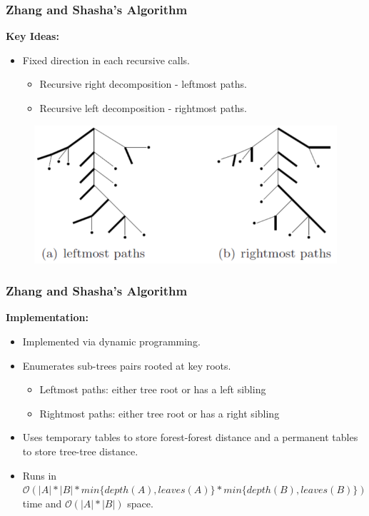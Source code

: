 \documentclass{beamer}
\begin{document}
\begin{frame}
\frametitle{Zhang and Shasha's Algorithm}
\textbf{Key Ideas:}
\begin{itemize}
\item Fixed direction in each recursive calls.
\begin{itemize}
\item Recursive right decomposition - leftmost paths.
\item Recursive left decomposition - rightmost paths.
\end{itemize}
\end{itemize}
\begin{figure}
	\includegraphics[width=0.7\linewidth]{LeftmostPathandRightmostPath}
	\centering
\end{figure}
\end{frame}
\begin{frame}
\frametitle{Zhang and Shasha's Algorithm}
\textbf{Implementation:}
\begin{itemize}
\item Implemented via dynamic programming.
\item Enumerates sub-trees pairs rooted at key roots.
\begin{itemize}
\item Leftmost paths: either tree root or has a left sibling
\item Rightmost paths: either tree root or has a right sibling
\end{itemize}
\item Uses temporary tables to store forest-forest distance and a permanent tables to store tree-tree distance.
\item Runs in $\mathcal{O}(\left\vert A \right\vert * \left\vert B \right\vert *min\{depth(A), leaves(A)\}*min\{depth(B), leaves(B)\})$ time and $\mathcal{O}(\left\vert A \right\vert * \left\vert B \right\vert)$ space. 
\end{itemize}
\end{frame}
\end{document}
